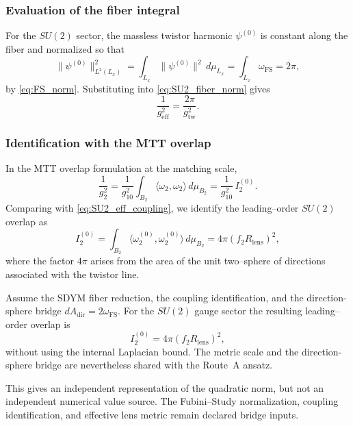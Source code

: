 \documentclass[11pt]{article}
\begin{document}
\subsubsection{Evaluation of the fiber integral}

For the $SU(2)$ sector, the massless twistor harmonic $\psi^{(0)}$ is constant
along the fiber and normalized so that
\[
\|\psi^{(0)}\|_{L^2(L_x)}^2
=
\int_{L_x}\|\psi^{(0)}\|^2\,d\mu_{L_x}
=
\int_{L_x}\omega_{\mathrm{FS}}
=
2\pi,
\]
by \eqref{eq:FS_norm}.
Substituting into \eqref{eq:SU2_fiber_norm} gives
\begin{equation}
\frac{1}{g_{\mathrm{eff}}^2}
=
\frac{2\pi}{g_{\mathrm{tw}}^2}.
\label{eq:SU2_eff_coupling}
\end{equation}

\subsubsection{Identification with the MTT overlap}

In the MTT overlap formulation at the matching scale,
\[
\frac{1}{g_2^2}
=
\frac{1}{g_{10}^2}
\int_{B_2}\langle\omega_2,\omega_2\rangle\,d\mu_{B_2}
=
\frac{1}{g_{10}^2}\,I_2^{(0)}.
\]
Comparing with \eqref{eq:SU2_eff_coupling}, we identify the leading--order
$SU(2)$ overlap as
\begin{equation}
I_2^{(0)}
=
\int_{B_2}\langle\omega_2^{(0)},\omega_2^{(0)}\rangle\,d\mu_{B_2}
=
4\pi (f_2R_{\mathrm{lens}})^2,
\label{eq:SU2_overlap_final}
\end{equation}
where the factor $4\pi$ arises from the area of the unit two--sphere of
directions associated with the twistor line.

\begin{theorem}
Assume the SDYM fiber reduction, the coupling identification, and the
direction-sphere bridge $dA_{\mathrm{dir}}=2\omega_{\mathrm{FS}}$. For the
$SU(2)$ gauge sector the resulting leading--order overlap is
\[
I_2^{(0)} = 4\pi (f_2R_{\mathrm{lens}})^2,
\]
without using the internal Laplacian bound. The metric scale and the
direction-sphere bridge are nevertheless shared with the Route~A ansatz.
\end{theorem}

\begin{remark}
This gives an independent representation of the quadratic norm, but not an
independent numerical value source. The Fubini--Study normalization, coupling
identification, and effective lens metric remain declared bridge inputs.
\end{remark}
\end{document}
